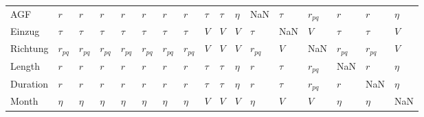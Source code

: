 \begin{tabular}{lllllllllllllllll}
AGF      &       $r$ &       $r$ &       $r$ &       $r$ &       $r$ &       $r$ &       $r$ &  $\tau$ &  $\tau$ &  $\eta$ &       NaN &  $\tau$ &  $r_{pq}$ &       $r$ &       $r$ &  $\eta$ \\
Einzug   &    $\tau$ &    $\tau$ &    $\tau$ &    $\tau$ &    $\tau$ &    $\tau$ &    $\tau$ &     $V$ &     $V$ &     $V$ &    $\tau$ &     NaN &       $V$ &    $\tau$ &    $\tau$ &     $V$ \\
Richtung &  $r_{pq}$ &  $r_{pq}$ &  $r_{pq}$ &  $r_{pq}$ &  $r_{pq}$ &  $r_{pq}$ &  $r_{pq}$ &     $V$ &     $V$ &     $V$ &  $r_{pq}$ &     $V$ &       NaN &  $r_{pq}$ &  $r_{pq}$ &     $V$ \\
Length   &       $r$ &       $r$ &       $r$ &       $r$ &       $r$ &       $r$ &       $r$ &  $\tau$ &  $\tau$ &  $\eta$ &       $r$ &  $\tau$ &  $r_{pq}$ &       NaN &       $r$ &  $\eta$ \\
Duration &       $r$ &       $r$ &       $r$ &       $r$ &       $r$ &       $r$ &       $r$ &  $\tau$ &  $\tau$ &  $\eta$ &       $r$ &  $\tau$ &  $r_{pq}$ &       $r$ &       NaN &  $\eta$ \\
Month    &    $\eta$ &    $\eta$ &    $\eta$ &    $\eta$ &    $\eta$ &    $\eta$ &    $\eta$ &     $V$ &     $V$ &     $V$ &    $\eta$ &     $V$ &       $V$ &    $\eta$ &    $\eta$ &     NaN \\
\bottomrule
\end{tabular}

